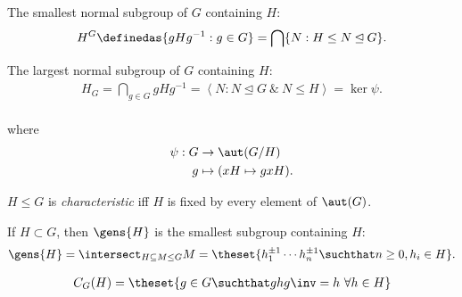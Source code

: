 \begin{definition}

The smallest normal subgroup of \(G\) containing \(H\):
\begin{align*}
H^G \definedas \{gHg^{-1}: g\in G\} = \bigcap \{ N: H \leq N \unlhd G \}
.\end{align*}

\end{definition}

\begin{definition}

The largest normal subgroup of \(G\) containing \(H\): \begin{align*}
H_G = \bigcap_{g\in G} gHg^{-1} = \left\langle  N: N \unlhd G ~\&~ N \leq H\right\rangle = \ker \psi
.\end{align*}\\
where \begin{align*}
\psi: G &\to \aut(G/H) \\
g &\mapsto (xH\mapsto gxH)
.\end{align*}

\end{definition}

\begin{definition}

\(H\leq G\) is \emph{characteristic} iff \(H\) is fixed by every element
of \(\aut(G)\).

\end{definition}

\begin{definition}

If \(H\subset G\), then \(\gens{H}\) is the smallest subgroup containing
\(H\): \begin{align*}
\gens{H} = \intersect_{H\subseteq M \leq G} M = \theset{ h_1^{\pm 1} \cdots h_n^{\pm 1} \suchthat n\geq 0, h_i \in H}
.\end{align*}

\end{definition}

\begin{definition}[Centralizer]

\begin{align*}
C_G(H) = \theset{g\in G \suchthat ghg\inv = h ~\forall h\in H}
\end{align*}

\end{definition}

